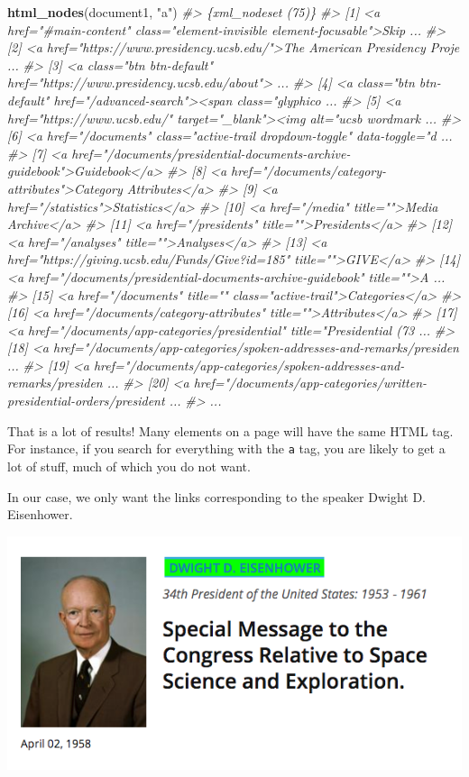 \documentclass[]{book}
\newenvironment{Shaded}{\begin{snugshade}}{\end{snugshade}}
\newcommand{\KeywordTok}[1]{\textcolor[rgb]{0.13,0.29,0.53}{\textbf{#1}}}
\newcommand{\StringTok}[1]{\textcolor[rgb]{0.31,0.60,0.02}{#1}}
\newcommand{\CommentTok}[1]{\textcolor[rgb]{0.56,0.35,0.01}{\textit{#1}}}
\newcommand{\NormalTok}[1]{#1}
\begin{document}
\begin{Shaded}
\begin{Highlighting}[]
\KeywordTok{html_nodes}\NormalTok{(document1, }\StringTok{"a"}\NormalTok{)}
\CommentTok{#> \{xml_nodeset (75)\}}
\CommentTok{#>  [1] <a href="#main-content" class="element-invisible element-focusable">Skip ...}
\CommentTok{#>  [2] <a href="https://www.presidency.ucsb.edu/">The American Presidency Proje ...}
\CommentTok{#>  [3] <a class="btn btn-default" href="https://www.presidency.ucsb.edu/about"> ...}
\CommentTok{#>  [4] <a class="btn btn-default" href="/advanced-search"><span class="glyphico ...}
\CommentTok{#>  [5] <a href="https://www.ucsb.edu/" target="_blank"><img alt="ucsb wordmark  ...}
\CommentTok{#>  [6] <a href="/documents" class="active-trail dropdown-toggle" data-toggle="d ...}
\CommentTok{#>  [7] <a href="/documents/presidential-documents-archive-guidebook">Guidebook</a>}
\CommentTok{#>  [8] <a href="/documents/category-attributes">Category Attributes</a>}
\CommentTok{#>  [9] <a href="/statistics">Statistics</a>}
\CommentTok{#> [10] <a href="/media" title="">Media Archive</a>}
\CommentTok{#> [11] <a href="/presidents" title="">Presidents</a>}
\CommentTok{#> [12] <a href="/analyses" title="">Analyses</a>}
\CommentTok{#> [13] <a href="https://giving.ucsb.edu/Funds/Give?id=185" title="">GIVE</a>}
\CommentTok{#> [14] <a href="/documents/presidential-documents-archive-guidebook" title="">A ...}
\CommentTok{#> [15] <a href="/documents" title="" class="active-trail">Categories</a>}
\CommentTok{#> [16] <a href="/documents/category-attributes" title="">Attributes</a>}
\CommentTok{#> [17] <a href="/documents/app-categories/presidential" title="Presidential (73 ...}
\CommentTok{#> [18] <a href="/documents/app-categories/spoken-addresses-and-remarks/presiden ...}
\CommentTok{#> [19] <a href="/documents/app-categories/spoken-addresses-and-remarks/presiden ...}
\CommentTok{#> [20] <a href="/documents/app-categories/written-presidential-orders/president ...}
\CommentTok{#> ...}
\end{Highlighting}
\end{Shaded}

That is a lot of results! Many elements on a page will have the same
HTML tag. For instance, if you search for everything with the \texttt{a}
tag, you are likely to get a lot of stuff, much of which you do not
want.

In our case, we only want the links corresponding to the speaker Dwight
D. Eisenhower.

\begin{center}\includegraphics[width=0.7\linewidth]{img/scraping-links} \end{center}
\end{document}
